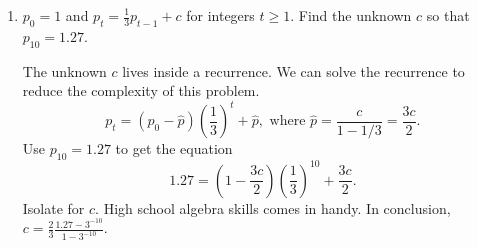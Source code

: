 \documentclass[../main.tex]{subfiles}
\begin{document}
\begin{exercise}
\begin{enumerate}
\begin{solution}
        This expression looks painful. The good news is that the problem-solving idea hasn't changed. We isolate for the unknown \(a\). Bite the bullet and do (high school) algebra.

        Turn everything into a quotient with \(1 - a\) in the denominator.
        \[
          1000 = \frac{((1-a) 3000 + 100)a^{17} - 100}{1 - a}.
        \]
        Watch out for goofs on the left-hand side. The left-hand side should be \(1000\) because it comes from \(b_{17}\). The numbers are specifically chosen so that you have to pay attention to algebraic details. Multiply \(1-a\) over to the left-hand side to get
        \[
          1000 (1 - a) = ((1-a) 3000 + 100)a^{17} - 100.
        \]
        A bit more rearrangement give us
        \[
          -3000 a^{18} + 3100 a^{17} + 1000 a - 1100 = 0.
        \]
        This is the polynomial relation we are looking for.

        Lots software can approximate \(a\) to arbitrary precision. The point of this exercise is to show you that the we can combine the technique of solving recurrence and some basic algebra manipulations to convert a unfamiliar problem into a familiar problem. 
      \end{solution}

    \item \(p_{0} = 1\) and \(p_{t} = \frac{1}{3} p_{t-1} + c\) for integers \(t \ge 1\).  Find the unknown \(c\) so that \(p_{10} = 1.27\).

      \begin{solution}
        The unknown \(c\) lives inside a recurrence. We can solve the recurrence to reduce the complexity of this problem. 
        \[
          p_{t} = (p_{0} - \hat{p}) \left( \frac{1}{3} \right)^{t} + \hat{p}, \text{ where } \hat{p} = \frac{c}{1 - 1/3} = \frac{3c}{2}.
        \]
        Use \(p_{10} = 1.27\) to get the equation 
        \[
          1.27 = \left(1 - \frac{3c}{2}\right) \left( \frac{1}{3} \right)^{10} + \frac{3c}{2}.
        \]
       Isolate for \(c\). High school algebra skills comes in handy. In conclusion, \(c = \frac{2}{3}\frac{1.27 - 3^{-10}}{1 - 3^{-10}}\).
      \end{solution}
  \end{enumerate}
\end{exercise}
\end{document}
